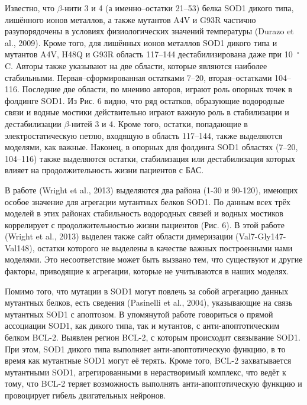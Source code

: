 Известно, что $\beta$-нити 3 и 4 (а именно--остатки 21–53) белка SOD1 дикого типа, лишённого ионов металлов, а также мутантов A4V и G93R частично разупорядочены в условиях физиологических значений температуры (Durazo et al., 2009). Кроме того, для лишённых ионов металлов SOD1 дикого типа и мутантов A4V, H48Q и G93R область 117–144 дестабилизирована даже при 10~${}^\circ$C. Авторы также указывают на две области, которые являются наиболее стабильными. Первая--сформированная остатками 7–20, вторая--остатками 104–116. Последние две области, по мнению авторов, играют роль опорных точек в фолдинге SOD1. Из Рис. 6 видно, что ряд остатков, образующие водородные связи и водные мостики действительно играют важную роль в стабилизации и дестабилизации $\beta$-нитей 3 и 4. Кроме того, остатки, попадающие в электростатическую петлю, входящую в область 117–144, также выделяются моделями, как важные. Наконец, в опорных для фолдинга SOD1 областях (7–20, 104–116) также выделяются остатки, стабилизация или дестабилизация которых влияет на продолжительность жизни пациентов с БАС.

В работе (Wright et al., 2013) выделяются два района (1-30 и 90-120), имеющих особое значение для агрегации мутантных белков SOD1. По данным всех трёх моделей в этих районах стабильность водородных связей и водных мостиков коррелирует с продолжительностью жизни пациентов (Рис. 6). В этой работе (Wright et al., 2013) выделен также сайт области димеризации (Val7-Gly147-Val148), остатки которого не выделены в качестве важных построенными нами моделями. Это несоответствие может быть вызвано тем, что существуют и другие факторы, приводящие к агрегации, которые не учитываются в наших моделях.

Помимо того, что мутации в SOD1 могут повлечь за собой агрегацию данных мутантных  белков, есть сведения (Pasinelli et al., 2004), указывающие на связь мутантных SOD1 с апоптозом. В упомянутой работе говориться о прямой ассоциации SOD1, как дикого типа, так и мутантов, с анти-апоптотическим белком BCL-2. Выявлен регион BCL-2, с которым происходит связывание SOD1. При этом, SOD1 дикого типа выполняет анти-апоптотическую функцию, в то время как мутантные SOD1 могут её терять. Кроме того, BCL-2 захватывается мутантными SOD1, агрегированными в нерастворимый комплекс, что ведёт к тому, что BCL-2 теряет возможность выполнять анти-апоптотическую функцию и провоцирует гибель двигательных нейронов.